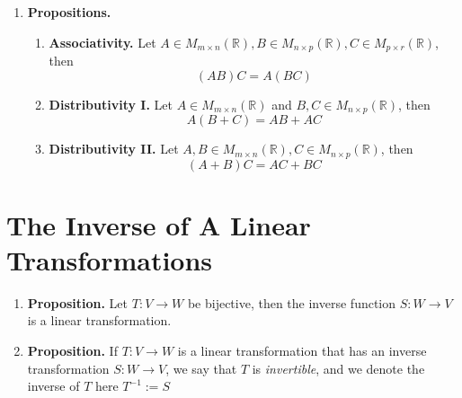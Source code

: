 \documentclass[oneside, 12pt]{book}
\newcommand{\settag}[1]{\renewcommand{\theenumi}{#1}}
\newcommand{\R}{\mathbb{R}}
\newcommand{\tbf}[1]{\textbf{#1}}
\newcommand{\tit}[1]{\textit{#1}}
\newcommand{\trans}[3]{$#1:#2\rightarrow{}#3$}
\newcommand{\mat}[2]{M_{#1 \times #2}(\R)}
\newcommand{\para}[1]{\item \tbf{#1}}
\begin{document}
\begin{enumerate}
    \settag{2.5.14}
    \para{Propositions.}
    \begin{enumerate}
        \item \tbf{Associativity.} Let $A\in M_{m\times n}(\R), B\in M_{n\times p}(\R), C\in M_{p\times r}(\R)$, then
        \begin{equation*}
            (AB)C = A(BC)
        \end{equation*}
        
        \item \tbf{Distributivity I.} Let $A\in M_{m\times n}(\R)$ and $B, C\in M_{n\times p}(\R)$, then
        \begin{equation*}
            A(B+C) = AB + AC
        \end{equation*}
        
        \item \tbf{Distributivity II.} Let $A, B\in \mat{m}{n}, C\in \mat{n}{p}$, then
        \begin{equation*}
            (A+B)C = AC + BC
        \end{equation*}
    \end{enumerate}
\end{enumerate}

\section{The Inverse of A Linear Transformations}
\begin{enumerate}
    \settag{2.6.1}
    \para{Proposition.} Let \trans{T}{V}{W} be bijective, then the inverse function \trans{S}{W}{V} is a linear transformation.
    
    \settag{2.6.2}
    \para{Proposition.} If \trans{T}{V}{W} is a linear transformation that has an inverse transformation \trans{S}{W}{V}, we say that $T$ is \tit{invertible}, and we denote the inverse of $T$ here $T^{-1} := S$ 
    
    
\end{enumerate}
\end{document}
